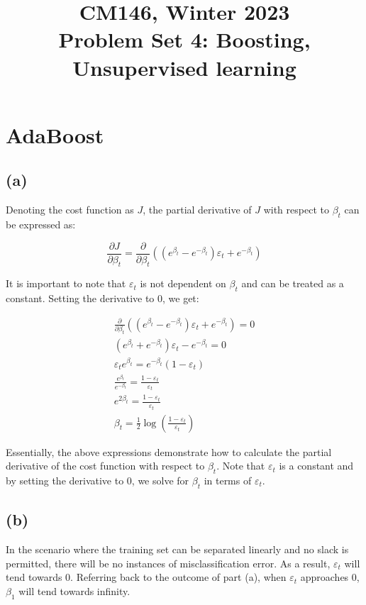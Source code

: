 \documentclass[11pt]{article}
\title{CM146, Winter 2023 \\ Problem Set 4: Boosting, Unsupervised learning}
\newcommand{\sol}[1]{{\bf{\color{magenta}{{Solution:}}}}}
\begin{document}
\author{}
\date{}
\vspace{0in}
\maketitle
\vspace{-0.75in}

\section{AdaBoost}

\subsection{(a)}
\sol x Denoting the cost function as $J$, the partial derivative of $J$ with respect to $\beta_t$ can be expressed as:

$$
\frac{\partial J}{\partial \beta_{t}}=\frac{\partial}{\partial \beta_{t}}\left(\left(e^{\beta_{t}}-e^{-\beta_{t}}\right) \varepsilon_{t}+e^{-\beta_{t}}\right)
$$

It is important to note that $\varepsilon_{t}$ is not dependent on $\beta_{t}$ and can be treated as a constant. Setting the derivative to 0, we get:

$$
\begin{gathered}
\frac{\partial}{\partial \beta_{t}}\left(\left(e^{\beta_{t}}-e^{-\beta_{t}}\right) \varepsilon_{t}+e^{-\beta_{t}}\right)=0 \\
\left(e^{\beta_{t}}+e^{-\beta_{t}}\right) \varepsilon_{t}-e^{-\beta_{t}}=0 \\
\varepsilon_{t} e^{\beta_{t}}=e^{-\beta_{t}}\left(1-\varepsilon_{t}\right) \\
\frac{e^{\beta_{t}}}{e^{-\beta_{t}}}=\frac{1-\varepsilon_{t}}{\varepsilon_{t}} \\
e^{2 \beta_{t}}=\frac{1-\varepsilon_{t}}{\varepsilon_{t}} \\
\beta_{t}=\frac{1}{2} \log \left(\frac{1-\varepsilon_{t}}{\varepsilon_{t}}\right)
\end{gathered}
$$

Essentially, the above expressions demonstrate how to calculate the partial derivative of the cost function with respect to $\beta_t$. Note that $\varepsilon_t$ is a constant and by setting the derivative to 0, we solve for $\beta_t$ in terms of $\varepsilon_t$.

\subsection{(b)}
\sol x In the scenario where the training set can be separated linearly and no slack is permitted, there will be no instances of misclassification error. As a result, $\varepsilon_t$ will tend towards 0. Referring back to the outcome of part (a), when $\varepsilon_t$ approaches 0, $\beta_1$ will tend towards infinity.
\end{document}
